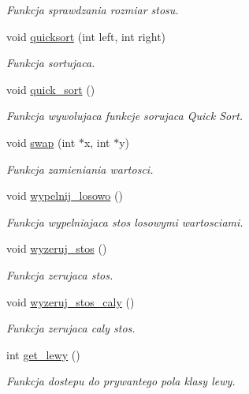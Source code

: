 \begin{DoxyCompactItemize}
\begin{DoxyCompactList}\small\item\em Funkcja sprawdzania rozmiar stosu. \end{DoxyCompactList}\item 
void \hyperlink{classstos__tablica_a340038b0ac6af3983de3fe21fa54aa36}{quicksort} (int left, int right)
\begin{DoxyCompactList}\small\item\em Funkcja sortujaca. \end{DoxyCompactList}\item 
void \hyperlink{classstos__tablica_a636f59632a29c985a404c0c8a3a9a18f}{quick\-\_\-sort} ()
\begin{DoxyCompactList}\small\item\em Funkcja wywolujaca funkcje sorujaca Quick Sort. \end{DoxyCompactList}\item 
void \hyperlink{classstos__tablica_a64e273a78434133331b24a4f9bbff87b}{swap} (int $\ast$x, int $\ast$y)
\begin{DoxyCompactList}\small\item\em Funkcja zamieniania wartosci. \end{DoxyCompactList}\item 
void \hyperlink{classstos__tablica_abeeb3fc4e2bc9a9b9917b3e996eb388e}{wypelnij\-\_\-losowo} ()
\begin{DoxyCompactList}\small\item\em Funkcja wypelniajaca stos losowymi wartosciami. \end{DoxyCompactList}\item 
void \hyperlink{classstos__tablica_a430a06f13dc5a74bca50b07cc993196c}{wyzeruj\-\_\-stos} ()
\begin{DoxyCompactList}\small\item\em Funkcja zerujaca stos. \end{DoxyCompactList}\item 
void \hyperlink{classstos__tablica_aabebf0add57a2440cddd9b4305d165f8}{wyzeruj\-\_\-stos\-\_\-caly} ()
\begin{DoxyCompactList}\small\item\em Funkcja zerujaca caly stos. \end{DoxyCompactList}\item 
int \hyperlink{classstos__tablica_a688f873f65a862620d11b92f9d52c685}{get\-\_\-lewy} ()
\begin{DoxyCompactList}\small\item\em Funkcja dostepu do prywantego pola klasy lewy. \end{DoxyCompactList}\item 

\end{DoxyCompactItemize}
